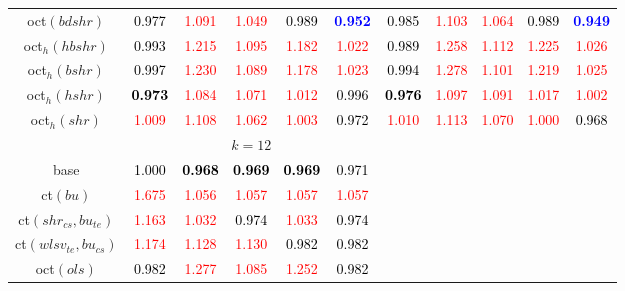 \begin{tabular}[t]{c|>{}cccc>{}c|ccccc}
oct$(bdshr)$ & \textcolor{black}{0.977} & \textcolor{red}{1.091} & \textcolor{red}{1.049} & \textcolor{black}{0.989} & \textcolor{blue}{\textbf{0.952}} & \textcolor{black}{0.985} & \textcolor{red}{1.103} & \textcolor{red}{1.064} & \textcolor{black}{0.989} & \textcolor{blue}{\textbf{0.949}}\\
oct$_h(hbshr)$ & \textcolor{black}{0.993} & \textcolor{red}{1.215} & \textcolor{red}{1.095} & \textcolor{red}{1.182} & \textcolor{red}{1.022} & \textcolor{black}{0.989} & \textcolor{red}{1.258} & \textcolor{red}{1.112} & \textcolor{red}{1.225} & \textcolor{red}{1.026}\\
oct$_h(bshr)$ & \textcolor{black}{0.997} & \textcolor{red}{1.230} & \textcolor{red}{1.089} & \textcolor{red}{1.178} & \textcolor{red}{1.023} & \textcolor{black}{0.994} & \textcolor{red}{1.278} & \textcolor{red}{1.101} & \textcolor{red}{1.219} & \textcolor{red}{1.025}\\
oct$_h(hshr)$ & \textcolor{black}{\textbf{0.973}} & \textcolor{red}{1.084} & \textcolor{red}{1.071} & \textcolor{red}{1.012} & \textcolor{black}{0.996} & \textcolor{black}{\textbf{0.976}} & \textcolor{red}{1.097} & \textcolor{red}{1.091} & \textcolor{red}{1.017} & \textcolor{red}{1.002}\\
oct$_h(shr)$ & \textcolor{red}{1.009} & \textcolor{red}{1.108} & \textcolor{red}{1.062} & \textcolor{red}{1.003} & \textcolor{black}{0.972} & \textcolor{red}{1.010} & \textcolor{red}{1.113} & \textcolor{red}{1.070} & \textcolor{red}{1.000} & \textcolor{black}{0.968}\\
\addlinespace[0.3em]
\multicolumn{1}{c}{} & \multicolumn{5}{c}{\textbf{$k = 12$}} & \multicolumn{5}{c}{}\\
base & \textcolor{black}{1.000} & \textcolor{black}{\textbf{0.968}} & \textcolor{black}{\textbf{0.969}} & \textcolor{black}{\textbf{0.969}} & \textcolor{black}{0.971} &  &  &  &  & \\
ct$(bu)$ & \textcolor{red}{1.675} & \textcolor{red}{1.056} & \textcolor{red}{1.057} & \textcolor{red}{1.057} & \textcolor{red}{1.057} &  &  &  &  & \\
ct$(shr_{cs}, bu_{te})$ & \textcolor{red}{1.163} & \textcolor{red}{1.032} & \textcolor{black}{0.974} & \textcolor{red}{1.033} & \textcolor{black}{0.974} &  &  &  &  & \\
ct$(wlsv_{te}, bu_{cs})$ & \textcolor{red}{1.174} & \textcolor{red}{1.128} & \textcolor{red}{1.130} & \textcolor{black}{0.982} & \textcolor{black}{0.982} &  &  &  &  & \\
oct$(ols)$ & \textcolor{black}{0.982} & \textcolor{red}{1.277} & \textcolor{red}{1.085} & \textcolor{red}{1.252} & \textcolor{black}{0.982} &  &  &  &  & \\

\end{tabular}
